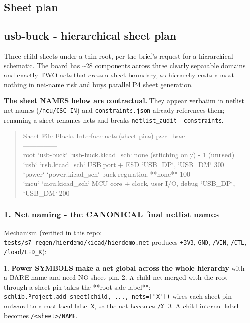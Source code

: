 \documentclass[11pt,a4paper]{article}
\begin{document}
\subsection*{Sheet plan}
\subsection*{usb-buck - hierarchical sheet plan}
Three child sheets under a thin root, per the brief's request for a hierarchical schematic. The board has \textasciitilde{}28 components across three clearly separable domains and exactly TWO nets that cross a sheet boundary, so hierarchy costs almost nothing in net-name risk and buys parallel P4 sheet generation.

\textbf{The sheet NAMES below are contractual.} They appear verbatim in netlist net names (\texttt{/mcu/OSC\_IN}) and \texttt{constraints.json} already references them; renaming a sheet renames nets and breaks \texttt{netlist\_audit --constraints}.

\begin{quote}\small\ttfamily\raggedright
\textbar{} Sheet \textbar{} File \textbar{} Blocks \textbar{} Interface nets (sheet pins) \textbar{} pwr\_base \textbar{}\\
\textbar{}---\textbar{}---\textbar{}---\textbar{}---\textbar{}---\textbar{}\\
\textbar{} root `usb-buck` \textbar{} `usb-buck.kicad\_sch` \textbar{} none (stitching only) \textbar{} - \textbar{} 1 (unused) \textbar{}\\
\textbar{} `usb` \textbar{} `usb.kicad\_sch` \textbar{} USB port + ESD \textbar{} `USB\_DP`, `USB\_DM` \textbar{} 300 \textbar{}\\
\textbar{} `power` \textbar{} `power.kicad\_sch` \textbar{} buck regulation \textbar{} {*}{*}none{*}{*} \textbar{} 100 \textbar{}\\
\textbar{} `mcu` \textbar{} `mcu.kicad\_sch` \textbar{} MCU core + clock, user I/O, debug \textbar{} `USB\_DP`, `USB\_DM` \textbar{} 200 \textbar{}
\end{quote}
\subsubsection*{1. Net naming - the CANONICAL final netlist names}
Mechanism (verified in this repo: \texttt{tests/s7\_regen/hierdemo/kicad/hierdemo.net} produces \texttt{+3V3}, \texttt{GND}, \texttt{/VIN}, \texttt{/CTL}, \texttt{/load/LED\_K}):

1. \textbf{Power SYMBOLS make a net global across the whole hierarchy} with a BARE name and need NO sheet pin. 2. A child net merged with the root through a sheet pin takes the {*}{*}root-side label{*}{*}: \texttt{schlib.Project.add\_sheet(child, ..., nets={[}"X"{]})} wires each sheet pin outward to a root local label \texttt{X}, so the net becomes \texttt{/X}. 3. A child-internal label becomes \texttt{/\textless{}sheet\textgreater{}/NAME}.
\end{document}
